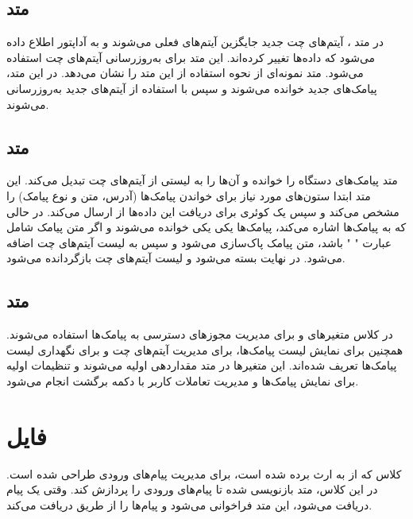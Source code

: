 \documentclass{report}
\begin{document}
\subsection{متد
}
در متد 
، آیتم‌های چت جدید جایگزین آیتم‌های فعلی می‌شوند و به آداپتور اطلاع داده می‌شود که داده‌ها تغییر کرده‌اند. این متد برای به‌روزرسانی آیتم‌های چت استفاده می‌شود. متد 
نمونه‌ای از نحوه استفاده از این متد را نشان می‌دهد. در این متد، پیامک‌های جدید خوانده می‌شوند و سپس با استفاده از
 آیتم‌های جدید به‌روزرسانی می‌شوند.

\subsection{متد
}
متد 
 پیامک‌های دستگاه را خوانده و آن‌ها را به لیستی از آیتم‌های چت تبدیل می‌کند. این متد ابتدا ستون‌های مورد نیاز برای خواندن پیامک‌ها (آدرس، متن و نوع پیامک) را مشخص می‌کند و سپس یک کوئری برای دریافت این داده‌ها از 
  ارسال می‌کند. در حالی که 
   به پیامک‌ها اشاره می‌کند، پیامک‌ها یکی یکی خوانده می‌شوند و اگر متن پیامک شامل عبارت 
   "
   " 
   باشد، متن پیامک پاک‌سازی می‌شود و سپس به لیست آیتم‌های چت اضافه می‌شود. در نهایت 
    بسته می‌شود و لیست آیتم‌های چت بازگردانده می‌شود.
\subsection{متد
}
در کلاس
 متغیرهای
  و 
  برای مدیریت مجوزهای دسترسی به پیامک‌ها استفاده می‌شوند. همچنین 
  برای نمایش لیست پیامک‌ها،
   برای مدیریت آیتم‌های چت و 
   برای نگهداری لیست پیامک‌ها تعریف شده‌اند. این متغیرها در متد
    مقداردهی اولیه می‌شوند و تنظیمات اولیه برای نمایش پیامک‌ها و مدیریت تعاملات کاربر با دکمه برگشت انجام می‌شود.
    
    
\section{فایل
}  
کلاس
 که از
  به ارث برده شده است، برای مدیریت پیام‌های ورودی
   طراحی شده است. در این کلاس، متد
    بازنویسی شده تا پیام‌های
     ورودی را پردازش کند. وقتی یک پیام 
     دریافت می‌شود، این متد فراخوانی می‌شود و پیام‌ها را از طریق
      دریافت می‌کند.
\end{document}
